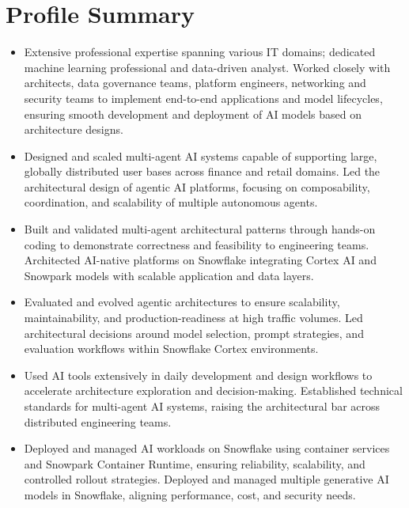 \documentclass[11pt,letterpaper]{article}
\begin{document}
\section*{Profile Summary}
\vspace{-20pt}
\begin{itemize}
  \item Extensive professional expertise spanning various IT domains; dedicated machine learning
        professional and data-driven analyst. Worked closely with architects, data governance teams,
        platform engineers, networking and security teams to implement end-to-end applications and
        model lifecycles, ensuring smooth development and deployment of AI models based on
        architecture designs.

  \item Designed and scaled multi-agent AI systems capable of supporting large, globally distributed
        user bases across finance and retail domains. Led the architectural design of agentic AI
        platforms, focusing on composability, coordination, and scalability of multiple autonomous
        agents.

  \item Built and validated multi-agent architectural patterns through hands-on coding to demonstrate
        correctness and feasibility to engineering teams. Architected AI-native platforms on Snowflake
        integrating Cortex AI and Snowpark models with scalable application and data layers.

  \item Evaluated and evolved agentic architectures to ensure scalability, maintainability, and
        production-readiness at high traffic volumes. Led architectural decisions around model
        selection, prompt strategies, and evaluation workflows within Snowflake Cortex environments.

  \item Used AI tools extensively in daily development and design workflows to accelerate architecture
        exploration and decision-making. Established technical standards for multi-agent AI systems,
        raising the architectural bar across distributed engineering teams.

  \item Deployed and managed AI workloads on Snowflake using container services and Snowpark Container
        Runtime, ensuring reliability, scalability, and controlled rollout strategies. Deployed and
        managed multiple generative AI models in Snowflake, aligning performance, cost, and security
        needs.


\end{itemize}
\end{document}
